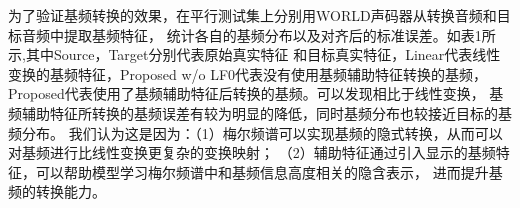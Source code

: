 为了验证基频转换的效果，在平行测试集上分别用WORLD声码器从转换音频和目标音频中提取基频特征，
统计各自的基频分布以及对齐后的标准误差。如表1所示,其中Source，Target分别代表原始真实特征
和目标真实特征，Linear代表线性变换的基频特征，Proposed w/o LF0代表没有使用基频辅助特征转换的基频，
Proposed代表使用了基频辅助特征后转换的基频。可以发现相比于线性变换，
基频辅助特征所转换的基频误差有较为明显的降低，同时基频分布也较接近目标的基频分布。
我们认为这是因为：（1）梅尔频谱可以实现基频的隐式转换，从而可以对基频进行比线性变换更复杂的变换映射；
（2）辅助特征通过引入显示的基频特征，可以帮助模型学习梅尔频谱中和基频信息高度相关的隐含表示，
进而提升基频的转换能力。

\begin{table} 
    \centering 


\end{table}
